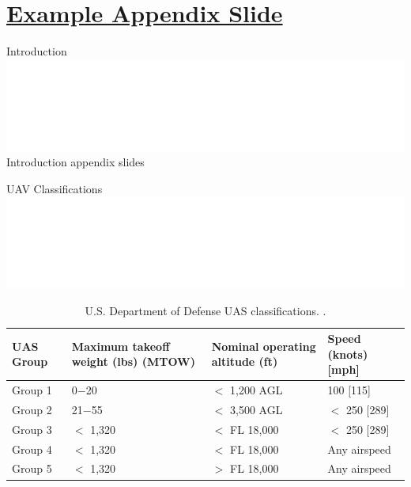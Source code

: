 \appendix
\section{\hyperlink{sec:intro}{Example Appendix Slide}}\label{apdx:intro}
\begin{frame}{Introduction \hfill \includegraphics[height=.5cm]{figs/uncc/whiteUNCCLogo.eps}}
    Introduction appendix slides
\end{frame}

\begin{frame}{UAV Classifications \hfill \includegraphics[height=.5cm]{figs/uncc/whiteUNCCLogo.eps}}
    \begin{table}[h!]
        \centering
        \small{\caption{U.S. Department of Defense UAS classifications. \cite{miller2021counter}.}}
        \begin{tabular}{|p{2.2cm}|p{2.2cm}|p{3cm}|p{3cm}|}
        \hline 
        \footnotesize{UAS Group} & \footnotesize{Maximum takeoff weight (lbs) (MTOW)} & \footnotesize{Nominal operating altitude (ft)} & \footnotesize{Speed} \newline \scriptsize{(knots) [mph]} 
            \\  \hline
            Group 1 & 0$-$20 & $<$ 1,200 AGL & 100 [115]
            \\ \hline
            Group 2 & 21$-$55 & $<$ 3,500 AGL & $<$ 250 [289]
            \\ \hline
            Group 3 & $<$ 1,320 & $<$ FL 18,000 & $<$ 250 [289]
            \\ \hline
            Group 4 & $<$ 1,320 & $<$ FL 18,000 & Any airspeed
            \\ \hline
            Group 5 & $<$ 1,320 & $>$ FL 18,000 & Any airspeed\\
            \hline
        \end{tabular}
        \label{tab:UAS_group}
    \end{table}
\end{frame}
